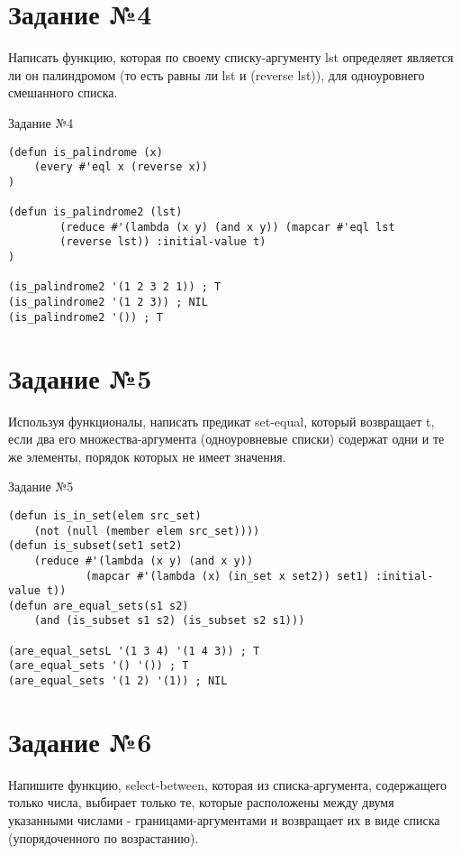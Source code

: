 \section{Задание №4}
Написать функцию, которая по своему списку-аргументу lst определяет является ли он палиндромом (то есть равны ли lst и (reverse lst)), для одноуровнего смешанного списка.

\begin{code}
\caption{Задание №4}
\label{code:bf4}
\begin{verbatim}
(defun is_palindrome (x)
    (every #'eql x (reverse x))
)

(defun is_palindrome2 (lst)
        (reduce #'(lambda (x y) (and x y)) (mapcar #'eql lst 
        (reverse lst)) :initial-value t)
)

(is_palindrome2 '(1 2 3 2 1)) ; T
(is_palindrome2 '(1 2 3)) ; NIL
(is_palindrome2 '()) ; T
\end{verbatim}
\end{code}

\section{Задание №5}
Используя функционалы, написать предикат set-equal, который возвращает t, если два его множества-аргумента (одноуровневые списки) содержат одни и те же элементы, порядок которых не имеет значения.

\begin{code}
\caption{Задание №5}
\label{code:bf5}
\begin{verbatim}
(defun is_in_set(elem src_set) 
	(not (null (member elem src_set))))
(defun is_subset(set1 set2)
    (reduce #'(lambda (x y) (and x y)) 
            (mapcar #'(lambda (x) (in_set x set2)) set1) :initial-value t))
(defun are_equal_sets(s1 s2)
    (and (is_subset s1 s2) (is_subset s2 s1)))
    
(are_equal_setsL '(1 3 4) '(1 4 3)) ; T
(are_equal_sets '() '()) ; T
(are_equal_sets '(1 2) '(1)) ; NIL
\end{verbatim}
\end{code}

\section{Задание №6}
Напишите функцию, select-between, которая из списка-аргумента, содержащего только числа, выбирает только те, которые расположены между двумя указанными числами - границами-аргументами и возвращает их в виде списка (упорядоченного по возрастанию).

